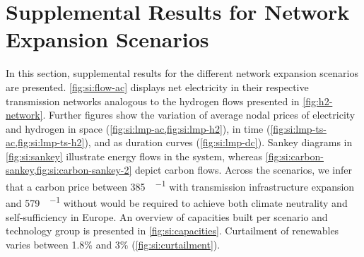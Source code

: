 

\section{Supplemental Results for Network Expansion Scenarios}
\label{sec:si:results-network-expansion}

In this section, supplemental results for the different network expansion
scenarios are presented. \cref{fig:si:flow-ac} displays net electricity in their
respective transmission networks analogous to the hydrogen flows presented in
\cref{fig:h2-network}. Further figures show the variation of average nodal
prices of electricity and hydrogen in space
(\cref{fig:si:lmp-ac,fig:si:lmp-h2}), in time
(\cref{fig:si:lmp-ts-ac,fig:si:lmp-ts-h2}), and as duration curves
(\cref{fig:si:lmp-dc}). Sankey diagrams in \cref{fig:si:sankey} illustrate
energy flows in the system, whereas
\cref{fig:si:carbon-sankey,fig:si:carbon-sankey-2} depict carbon flows. Across
the scenarios, we infer that a carbon price between \SI{385}{\sieuro\per\tco}
with transmission infrastructure expansion and \SI{579}{\sieuro\per\tco} without
would be required to achieve both climate neutrality and self-sufficiency in
Europe. An overview of capacities built per scenario and technology group is
presented in \cref{fig:si:capacities}. Curtailment of renewables varies between
1.8\% and 3\% (\cref{fig:si:curtailment}).

